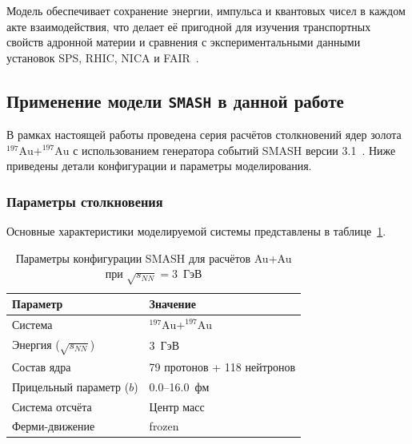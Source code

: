 \documentclass{extarticle}
\begin{document}
        Модель обеспечивает сохранение энергии, импульса и квантовых чисел в каждом акте взаимодействия, 
        что делает её пригодной для изучения транспортных свойств адронной материи и сравнения с 
        экспериментальными данными установок SPS, RHIC, NICA и FAIR~\cite{Weil:2016zrk}.


    \subsection{Применение модели \texttt{SMASH} в данной работе}
        В рамках настоящей работы проведена серия расчётов столкновений 
        ядер золота $^{197}\text{Au} + ^{197}\text{Au}$ 
        с использованием генератора событий SMASH версии 3.1~\cite{SMASH:Code}. 
        Ниже приведены детали конфигурации и параметры моделирования.

        \subsubsection{Параметры столкновения}
            Основные характеристики моделируемой системы 
            представлены в таблице~\ref{tab:smash_params}.

            \begin{table}[H]
                \centering
                \caption{
                    Параметры конфигурации SMASH 
                    для расчётов Au+Au при $\sqrt{s_{NN}} = 3$~ГэВ
                }\label{tab:smash_params}
                \begin{tabular}{|l|l|}
                    \hline
                    \textbf{Параметр} & \textbf{Значение} \\ \hline
                    Система & $^{197}\text{Au} + ^{197}\text{Au}$ \\ \hline
                    Энергия ($\sqrt{s_{NN}}$) & 3~ГэВ \\ \hline
                    Состав ядра & 79 протонов + 118 нейтронов \\ \hline
                    Прицельный параметр ($b$) & 0.0--16.0~фм \\ \hline
                    Система отсчёта & Центр масс \\ \hline
                    Ферми-движение & frozen \\ \hline
                \end{tabular}
            \end{table}
\end{document}
